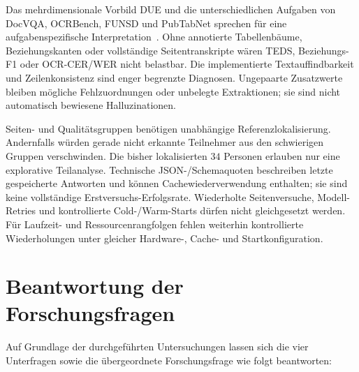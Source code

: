 Das mehrdimensionale Vorbild DUE und die unterschiedlichen Aufgaben von DocVQA, OCRBench, FUNSD und PubTabNet sprechen für eine aufgabenspezifische Interpretation~\cite{Borchmann2021DUE,Mathew2021DocVQA,Liu2024OCRBench,Jaume2019FUNSD,Zhong2020PubTabNet}. Ohne annotierte Tabellenbäume, Beziehungskanten oder vollständige Seitentranskripte wären TEDS, Beziehungs-F1 oder OCR-CER/WER nicht belastbar. Die implementierte Textauffindbarkeit und Zeilenkonsistenz sind enger begrenzte Diagnosen. Ungepaarte Zusatzwerte bleiben mögliche Fehlzuordnungen oder unbelegte Extraktionen; sie sind nicht automatisch bewiesene Halluzinationen.

Seiten- und Qualitätsgruppen benötigen unabhängige Referenzlokalisierung. Andernfalls würden gerade nicht erkannte Teilnehmer aus den schwierigen Gruppen verschwinden. Die bisher lokalisierten $34$ Personen erlauben nur eine explorative Teilanalyse. Technische JSON-/Schemaquoten beschreiben letzte gespeicherte Antworten und können Cachewiederverwendung enthalten; sie sind keine vollständige Erstversuchs-Erfolgsrate. Wiederholte Seitenversuche, Modell-Retries und kontrollierte Cold-/Warm-Starts dürfen nicht gleichgesetzt werden. Für Laufzeit- und Ressourcenrangfolgen fehlen weiterhin kontrollierte Wiederholungen unter gleicher Hardware-, Cache- und Startkonfiguration.

\section{Beantwortung der Forschungsfragen}
\label{sec:diskussion-forschungsfragen}

Auf Grundlage der durchgeführten Untersuchungen lassen sich die vier Unterfragen sowie die übergeordnete Forschungsfrage wie folgt beantworten:

